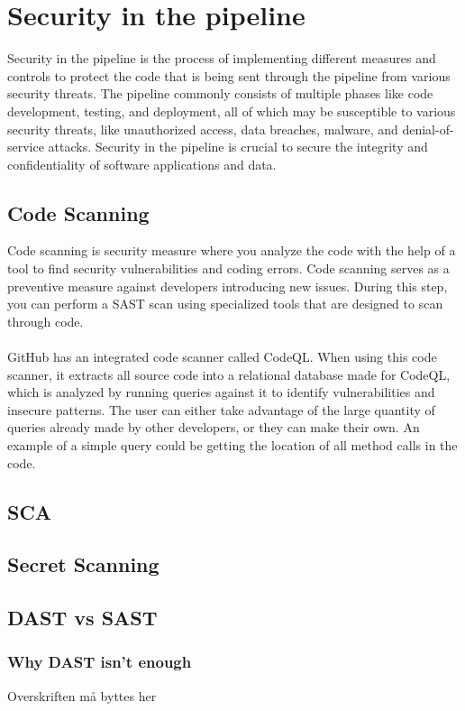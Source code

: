 \section{Security in the pipeline}
Security in the pipeline is the process of implementing different measures and controls to protect the code that is being sent through the pipeline from various security threats. The pipeline commonly consists of multiple phases like code development, testing, and deployment, all of which may be susceptible to various security threats, like unauthorized access, data breaches, malware, and denial-of-service attacks. Security in the pipeline is crucial to secure the integrity and confidentiality of software applications and data.

\subsection{Code Scanning}
Code scanning is security measure where you analyze the code with the help of a tool to find security vulnerabilities and coding errors. Code scanning serves as a preventive measure against developers introducing new issues. During this step, you can perform a SAST scan using specialized tools that are designed to scan through code. 
\\~\\
GitHub has an integrated code scanner called CodeQL. When using this code scanner, it extracts all source code into a relational database made for CodeQL, which is analyzed by  running queries against it to identify vulnerabilities and insecure patterns. The user can either take advantage of the large quantity of queries already made by other developers, or they can make their own. An example of a simple query could be getting the location of all method calls in the code. 
 
\subsection{SCA}

\subsection{Secret Scanning}
\subsection{DAST vs SAST}
\subsubsection{Why DAST isn't enough}
Overskriften må byttes her

